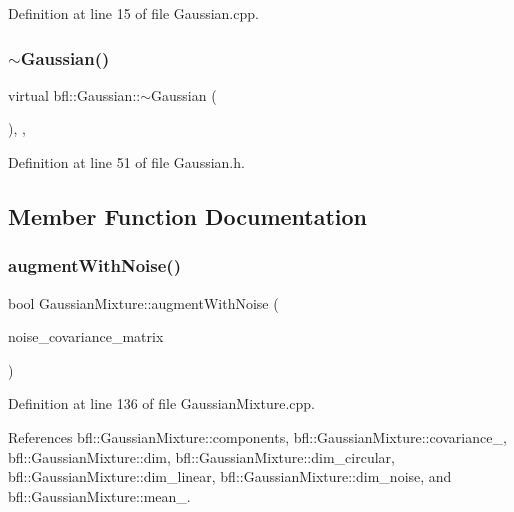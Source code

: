 Definition at line 15 of file Gaussian.\+cpp.

\mbox{\label{classbfl_1_1Gaussian_a073652fe6f52bf1833cdb3d73bec792f}} 
\subsubsection{\texorpdfstring{$\sim$\+Gaussian()}{~Gaussian()}}
{\footnotesize\ttfamily virtual bfl\+::\+Gaussian\+::$\sim$\+Gaussian (\begin{DoxyParamCaption}{ }\end{DoxyParamCaption})\hspace{0.3cm}{\ttfamily [inline]}, {\ttfamily [virtual]}, {\ttfamily [noexcept]}}



Definition at line 51 of file Gaussian.\+h.



\subsection{Member Function Documentation}
\mbox{\label{classbfl_1_1GaussianMixture_aec4e807341e18c18faed041c41121cb7}} 
\subsubsection{\texorpdfstring{augment\+With\+Noise()}{augmentWithNoise()}}
{\footnotesize\ttfamily bool Gaussian\+Mixture\+::augment\+With\+Noise (\begin{DoxyParamCaption}\item[{const Eigen\+::\+Ref$<$ const Eigen\+::\+Matrix\+Xd $>$ \&}]{noise\+\_\+covariance\+\_\+matrix }\end{DoxyParamCaption})\hspace{0.3cm}{\ttfamily [inherited]}}



Definition at line 136 of file Gaussian\+Mixture.\+cpp.



References bfl\+::\+Gaussian\+Mixture\+::components, bfl\+::\+Gaussian\+Mixture\+::covariance\+\_\+, bfl\+::\+Gaussian\+Mixture\+::dim, bfl\+::\+Gaussian\+Mixture\+::dim\+\_\+circular, bfl\+::\+Gaussian\+Mixture\+::dim\+\_\+linear, bfl\+::\+Gaussian\+Mixture\+::dim\+\_\+noise, and bfl\+::\+Gaussian\+Mixture\+::mean\+\_\+.



